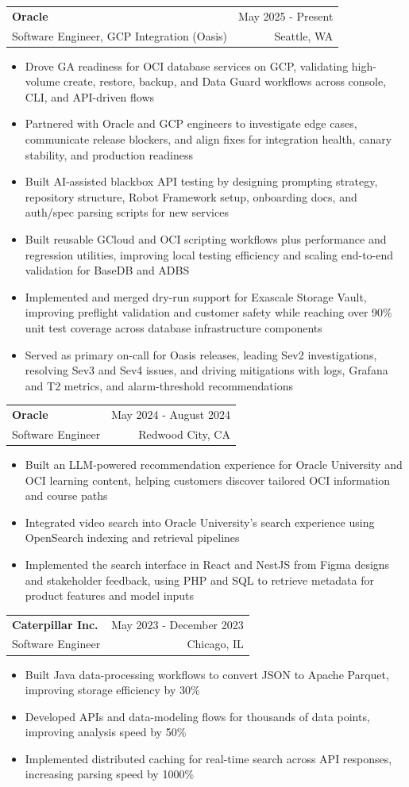 \documentclass[letterpaper,11pt]{article}
\makeatletter
\newcommand{\resumeItem}[1]{
  \item\small{
    {#1 \vspace{-1pt}}
  }
}
\newcommand{\resumeSubheading}[4]{
  \vspace{-2pt}\item
    \begin{tabular*}{0.97\textwidth}[t]{l@{\extracolsep{\fill}}r}
      \textbf{#1} & #2 \\
      {\small#3} & {\small #4} \\
    \end{tabular*}\vspace{-7pt}
}
\newcommand{\resumeItemListStart}{\begin{itemize}[leftmargin=0.18in,itemsep=1pt,topsep=2pt]}
\newcommand{\resumeItemListEnd}{\end{itemize}\vspace{-5pt}}
\makeatother
\begin{document}
    \resumeSubheading
  {Oracle}{May 2025 - Present}
  {Software Engineer, GCP Integration (Oasis)}{Seattle, WA}
  \resumeItemListStart
    \resumeItem{Drove GA readiness for OCI database services on GCP, validating high-volume create, restore, backup, and Data Guard workflows across console, CLI, and API-driven flows}
    \resumeItem{Partnered with Oracle and GCP engineers to investigate edge cases, communicate release blockers, and align fixes for integration health, canary stability, and production readiness}
    \resumeItem{Built AI-assisted blackbox API testing by designing prompting strategy, repository structure, Robot Framework setup, onboarding docs, and auth/spec parsing scripts for new services}
    \resumeItem{Built reusable GCloud and OCI scripting workflows plus performance and regression utilities, improving local testing efficiency and scaling end-to-end validation for BaseDB and ADBS}
    \resumeItem{Implemented and merged dry-run support for Exascale Storage Vault, improving preflight validation and customer safety while reaching over 90\% unit test coverage across database infrastructure components}
    \resumeItem{Served as primary on-call for Oasis releases, leading Sev2 investigations, resolving Sev3 and Sev4 issues, and driving mitigations with logs, Grafana and T2 metrics, and alarm-threshold recommendations}
  \resumeItemListEnd

    \resumeSubheading
      {Oracle}{May 2024 - August 2024}
      {Software Engineer}{Redwood City, CA}
      \resumeItemListStart
        \resumeItem{Built an LLM-powered recommendation experience for Oracle University and OCI learning content, helping customers discover tailored OCI information and course paths}
        \resumeItem{Integrated video search into Oracle University's search experience using OpenSearch indexing and retrieval pipelines}
        \resumeItem{Implemented the search interface in React and NestJS from Figma designs and stakeholder feedback, using PHP and SQL to retrieve metadata for product features and model inputs}
      \resumeItemListEnd

    \resumeSubheading
      {Caterpillar Inc.}{May 2023 - December 2023}
      {Software Engineer}{Chicago, IL}
      \resumeItemListStart
        \resumeItem{Built Java data-processing workflows to convert JSON to Apache Parquet, improving storage efficiency by 30\%}
        \resumeItem{Developed APIs and data-modeling flows for thousands of data points, improving analysis speed by 50\%}
        \resumeItem{Implemented distributed caching for real-time search across API responses, increasing parsing speed by 1000\%}
      \resumeItemListEnd
\end{document}
